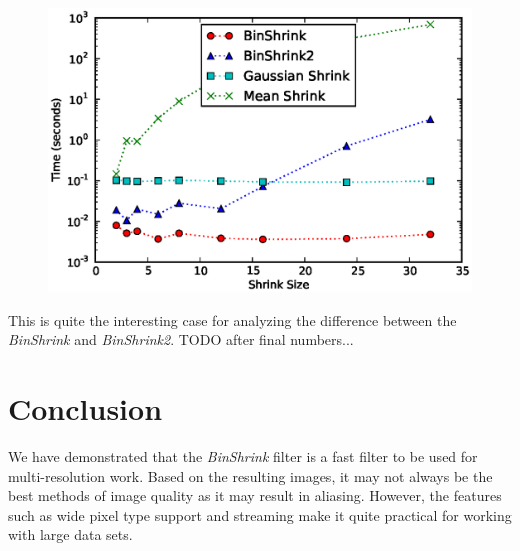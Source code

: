 \documentclass{InsightArticle}
\begin{document}
\begin{figure}
  \centering
  \includegraphics[width=0.8\linewidth]{images/shrink_time}
  \label{fig:ShrinkPerformance}
\end{figure}

This is quite the interesting case for analyzing the difference
between the \textit{BinShrink} and \textit{BinShrink2}. TODO after
final numbers...

\section{Conclusion}

We have demonstrated that the \textit{BinShrink} filter is a fast
filter to be used for multi-resolution work. Based on the resulting
images, it may not always be the best methods of image quality as it
may result in aliasing. However, the features such as wide pixel type
support and streaming make it quite practical for working with large
data sets.




\end{document}
